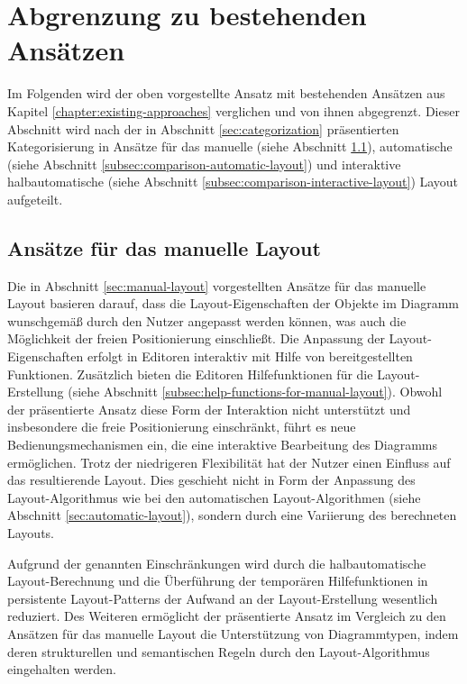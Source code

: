 
\section{Abgrenzung zu bestehenden Ansätzen}
\label{sec:current-approaches-comparison}

Im Folgenden wird der oben vorgestellte Ansatz mit bestehenden Ansätzen aus Kapitel \ref{chapter:existing-approaches} verglichen und von ihnen abgegrenzt. Dieser Abschnitt wird nach der in Abschnitt \ref{sec:categorization} präsentierten Kategorisierung in Ansätze für das manuelle (siehe Abschnitt \ref{subsec:comparison-manual-layout}), automatische (siehe Abschnitt \ref{subsec:comparison-automatic-layout}) und interaktive halbautomatische (siehe Abschnitt \ref{subsec:comparison-interactive-layout}) Layout aufgeteilt.

\subsection{Ansätze für das manuelle Layout}
\label{subsec:comparison-manual-layout}

Die in Abschnitt \ref{sec:manual-layout} vorgestellten Ansätze für das manuelle Layout basieren darauf, dass die Layout-Eigenschaften der Objekte im Diagramm wunschgemäß durch den Nutzer angepasst werden können, was auch die Möglichkeit der freien Positionierung einschließt. Die Anpassung der Layout-Eigenschaften erfolgt in Editoren interaktiv mit Hilfe von bereitgestellten Funktionen. Zusätzlich bieten die Editoren Hilfefunktionen für die Layout-Erstellung (siehe Abschnitt \ref{subsec:help-functions-for-manual-layout}). Obwohl der präsentierte Ansatz diese Form der Interaktion nicht unterstützt und insbesondere die freie Positionierung einschränkt, führt es neue Bedienungsmechanismen ein, die eine interaktive Bearbeitung des Diagramms ermöglichen. Trotz der niedrigeren Flexibilität hat der Nutzer einen Einfluss auf das resultierende Layout. Dies geschieht nicht in Form der Anpassung des Layout-Algorithmus wie bei den automatischen Layout-Algorithmen (siehe Abschnitt \ref{sec:automatic-layout}), sondern durch eine Variierung des berechneten Layouts.

Aufgrund der genannten Einschränkungen wird durch die halbautomatische Layout-Berechnung und die Überführung der temporären Hilfefunktionen in persistente Layout-Patterns der Aufwand an der Layout-Erstellung wesentlich reduziert. Des Weiteren ermöglicht der präsentierte Ansatz im Vergleich zu den Ansätzen für das manuelle Layout die Unterstützung von Diagrammtypen, indem deren strukturellen und semantischen Regeln durch den Layout-Algorithmus eingehalten werden.

